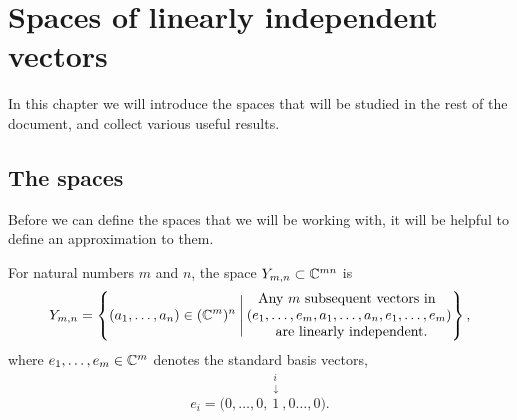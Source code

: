 



\chapter{Spaces of linearly independent vectors}
\label{chap:rum}


In this chapter we will introduce the spaces that will be studied in
the rest of the document, and collect various useful
results.

\section{The spaces} 
\label{sec:rum}
Before we can define the spaces that we will be working with, it will
be helpful to define an approximation to them.

\begin{definition} 
  For natural numbers $m$ and $n$, the space $Y_{m,n}\subset \mathbb{C}^{mn}$
  is
  \[ Y_{m,n} = \left\{ (a_1,\dots,a_n) \in (\mathbb{C}^m)^n \:\Bigg\vert\:
    \begin{matrix}
      \text{Any } m \text{ subsequent vectors in } \\
      (e_1,\dots,e_m,a_1,\dots,a_n,e_1,\dots,e_m) \\
      \text{ are linearly independent.}
    \end{matrix}  \right\}, \]
  where $e_1,\dots,e_m \in \mathbb{C}^m$ denotes the standard basis
  vectors,
  \[ e_i =
  \big(0,\dots,0,\overset{\substack{i\\\downarrow}}{1},0\dots,0\big).\]
\end{definition}

